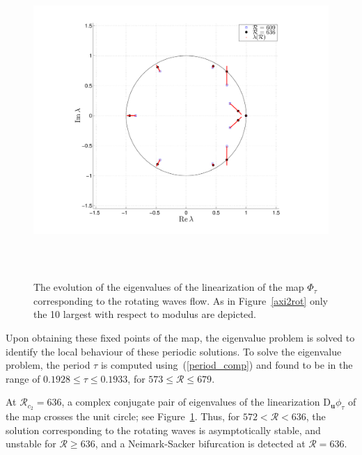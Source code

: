 \begin{figure}[t]
\centerline{\includegraphics[height = 12cm, keepaspectratio]{./figures/Pictures/Eigenvalue_period_torus}}
\caption{The evolution of the eigenvalues of the linearization of the map $\Phi_\tau$ corresponding to the rotating waves flow. As in Figure~\ref{axi2rot} only the 10 largest with respect to modulus are depicted.}
\label{eig_rot_torus}
\end{figure}

Upon obtaining these fixed points of the map, the eigenvalue problem is solved to identify the local behaviour of these periodic solutions. To solve the eigenvalue problem, the period $\tau$ is computed using~(\ref{period_comp}) and found to be in the range of $0.1928 \le\tau\le 0.1933$, for $573\le\mathcal{R}\le 679$.

At $\mathcal{R}_{c_2}= 636$, a complex conjugate pair of eigenvalues of the linearization $\mathrm{D}_{\mathbf{u}}\phi_\tau$ of the map crosses the unit circle; see Figure~\ref{eig_rot_torus}.  Thus, for $572 < \mathcal{R} < 636$, the solution corresponding to the rotating waves is asymptotically stable, and unstable for $\mathcal{R} \ge 636$, and a {Neimark-Sacker} bifurcation is detected at $\mathcal{R} = 636$.


